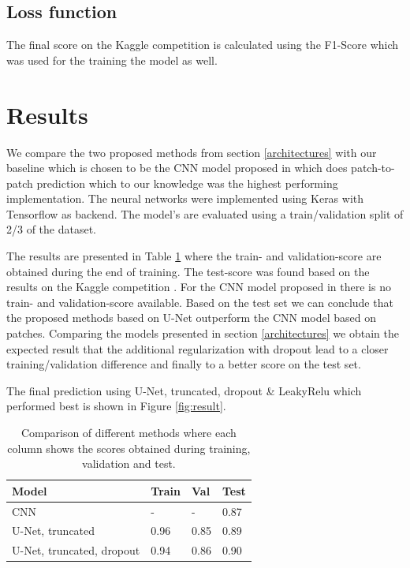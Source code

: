 \documentclass[10pt,conference,compsocconf]{IEEEtran}
\begin{document}
\subsection{Loss function}

The final score on the Kaggle competition \cite{KaggleCompetition} is calculated using the F1-Score which was used for the training the model as well.

\section{Results}

We compare the two proposed methods from section \ref{architectures} with our baseline which is chosen to be the CNN model proposed in \cite{Pavllo2017} which does patch-to-patch prediction which to our knowledge was the highest performing implementation. The neural networks were implemented using Keras with Tensorflow as backend. The model's are evaluated using a train/validation split of 2/3 of the dataset.

The results are presented in Table \ref{results-list} where the train- and validation-score are obtained during the end of training. The test-score was found based on the results on the Kaggle competition \cite{KaggleCompetition}. For the CNN model proposed in \cite{Pavllo2017} there is no train- and validation-score available. Based on the test set we can conclude that the proposed methods based on U-Net outperform the CNN model based on patches. Comparing the models presented in section \ref{architectures} we obtain the expected result that the additional regularization with dropout lead to a closer training/validation difference and finally to a better score on the test set.

The final prediction using U-Net, truncated, dropout \& LeakyRelu which performed best is shown in Figure \ref{fig:result}.

\begin{table}[]
\centering
\begin{tabular}{|l|l|l|l|}
\hline
\textbf{Model}                             & \textbf{Train} & \textbf{Val} & \textbf{Test} \\ \hline
CNN \cite{Pavllo2017} & -                    & -                         & 0.87                \\ \hline
U-Net, truncated                           & 0.96                 & 0.85                      & 0.89                \\ \hline
U-Net, truncated, dropout     & 0.94                 & 0.86                      & 0.90                \\ \hline
\end{tabular}
\caption{Comparison of different methods where each column shows the scores obtained during training, validation and test.}
\label{results-list}
\end{table}
\end{document}
